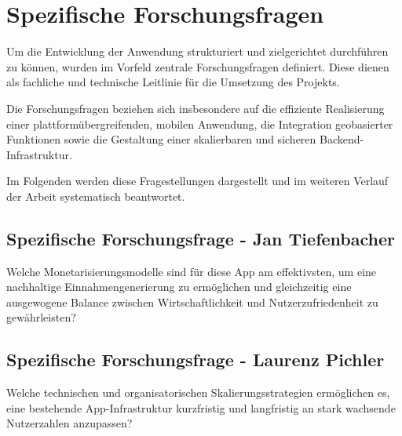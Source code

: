 \section{Spezifische Forschungsfragen}
Um die Entwicklung der Anwendung strukturiert und zielgerichtet durchführen zu können, wurden im Vorfeld zentrale Forschungsfragen definiert. Diese dienen als fachliche und technische Leitlinie für die Umsetzung des Projekts.

Die Forschungsfragen beziehen sich insbesondere auf die effiziente Realisierung einer plattformübergreifenden, mobilen Anwendung, die Integration geobasierter Funktionen sowie die Gestaltung einer skalierbaren und sicheren Backend-Infrastruktur.

Im Folgenden werden diese Fragestellungen dargestellt und im weiteren Verlauf der Arbeit systematisch beantwortet.
\subsection{Spezifische Forschungsfrage - Jan Tiefenbacher}
Welche Monetarisierungsmodelle sind für diese App am effektivsten, um eine nachhaltige Einnahmengenerierung zu ermöglichen und gleichzeitig eine ausgewogene Balance zwischen Wirtschaftlichkeit und Nutzerzufriedenheit zu gewährleisten?
\subsection{Spezifische Forschungsfrage - Laurenz Pichler}
Welche technischen und organisatorischen Skalierungsstrategien ermöglichen es, eine bestehende App-Infrastruktur kurzfristig und langfristig an stark wachsende Nutzerzahlen anzupassen?
